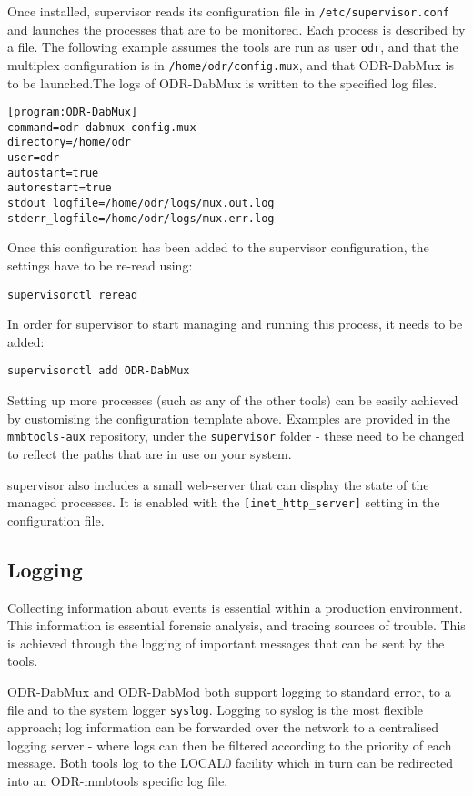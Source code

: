 Once installed, supervisor reads its configuration file in \texttt{/etc/supervisor.conf}
and launches the processes that are to be monitored. Each process is described 
by a file. The following example assumes the tools are run as user \texttt{odr},
and that the multiplex configuration is in \texttt{/home/odr/config.mux}, and 
that ODR-DabMux is to be launched.The logs of ODR-DabMux is written to the 
specified log files.

\begin{lstlisting}
[program:ODR-DabMux]
command=odr-dabmux config.mux
directory=/home/odr
user=odr
autostart=true
autorestart=true
stdout_logfile=/home/odr/logs/mux.out.log
stderr_logfile=/home/odr/logs/mux.err.log
\end{lstlisting}

Once this configuration has been added to the supervisor configuration, the
settings have to be re-read using:
\begin{lstlisting}
supervisorctl reread
\end{lstlisting}

In order for supervisor to start managing and running this process, it needs to
be added:

\begin{lstlisting}
supervisorctl add ODR-DabMux
\end{lstlisting}

Setting up more processes (such as any of the other tools) can be easily 
achieved by customising the configuration template above. Examples are provided
in the \texttt{mmbtools-aux} repository, under the \texttt{supervisor} folder - 
these need to be changed to reflect the paths that are in use on your system.

supervisor also includes a small web-server that can display the state of the
managed processes. It is enabled with the \verb+[inet_http_server]+ setting in
the configuration file.

\subsection{Logging}
Collecting information about events is essential within a production environment.
This information is essential forensic analysis, and tracing sources of trouble.
This is achieved through the logging of important messages that can be sent by 
the tools.

ODR-DabMux and ODR-DabMod both support logging to standard error, to a file and
to the system logger \texttt{syslog}. Logging to syslog is the most flexible
approach; log information can be forwarded over the network to a
centralised logging server - where logs can then be filtered according to the 
priority of each message. Both tools log to the LOCAL0 facility which in turn 
can be redirected into an ODR-mmbtools specific log file.

